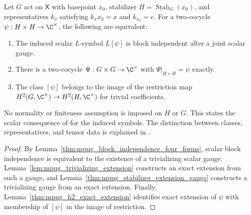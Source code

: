 \begin{lemma}
    \label{lem:mpug_scalar_bi_restriction}
    \leanok
    Let $G$ act on $\mathsf X$ with basepoint $x_0$, stabilizer
    $H=\operatorname{Stab}_G(x_0)$, and representatives $k_x$ satisfying
    $k_xx_0=x$ and $k_{x_0}=e$. For a two-cocycle
    $\psi:H\times H\to\C^\times$, the following are equivalent:
    \begin{enumerate}
        \item The induced scalar $L$-symbol $L[\psi]$ is block independent
              after a joint scalar gauge.
        \item There is a two-cocycle $\Psi:G\times G\to\C^\times$ with
              $\Psi|_{H\times H}=\psi$ exactly.
        \item The class $[\psi]$ belongs to the image of the restriction map
              $H^2(G,\C^\times)\to H^2(H,\C^\times)$ for trivial coefficients.
    \end{enumerate}
    No normality or finiteness assumption is imposed on $H$ or $G$.
    This states the scalar consequence of
    \cite[lines~7042--7064]{FrancoRubio2025MPUGauging} for the induced symbols.
    The distinction between classes, representatives, and tensor data is
    explained in \cite{gap:fbc25_mpu_action_stabilizer_source_audit}.
\end{lemma}

\begin{proof}\leanok
    By Lemma~\ref{thm:mpug_block_independence_four_forms}, scalar block
    independence is equivalent to the existence of a trivializing scalar
    gauge. Lemma~\ref{lem:mpug_trivializing_extension} constructs an exact
    extension from such a gauge, and
    Lemma~\ref{thm:mpug_stabilizer_extension_gauge} constructs a trivializing
    gauge from an exact extension. Finally,
    Lemma~\ref{thm:mpug_h2_exact_extension} identifies exact extension of
    $\psi$ with membership of $[\psi]$ in the image of restriction.
\end{proof}

